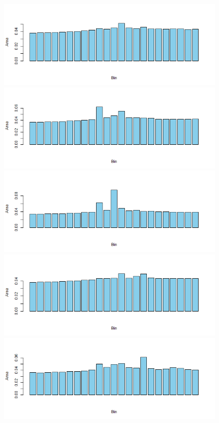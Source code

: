 \documentclass[11pt]{article}
\theoremstyle{plain}
\theoremstyle{definition}
\begin{document}
\begin{figure}[H]
\begin{center}
\includegraphics[trim ={3.5cm 2.7cm 2cm 2cm},scale=.6, clip=true]{Binned_Areas29.png}
\includegraphics[trim ={3.5cm 2.7cm 2cm 2cm},scale=.6, clip=true]{Binned_Areas30.png}
\includegraphics[trim ={3.5cm 2.7cm 2cm 2cm},scale=.6, clip=true]{Binned_Areas31.png}
\includegraphics[trim ={3.5cm 2.7cm 2cm 2cm},scale=.6, clip=true]{Binned_Areas32.png}
\includegraphics[trim ={3.5cm 2.7cm 2cm 2cm},scale=.6, clip=true]{Binned_Areas33.png}

\end{center}
\end{figure}
\end{document}
